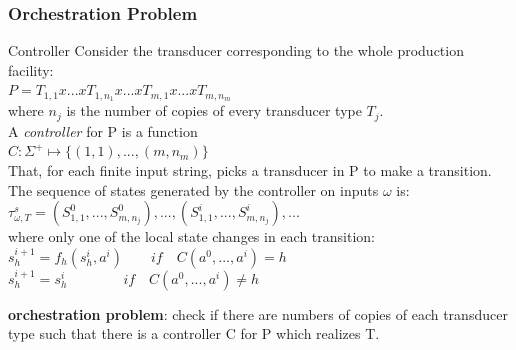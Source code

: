 \documentclass{beamer}
\begin{document}
\begin{frame}
\frametitle{Orchestration Problem}
\begin{block}{Controller}
Consider the transducer corresponding to the whole production facility:\\$P = T_{1,1} x...x T_{1,n_{1}} x ... x T_{m,1}x... x T_{m,n_{m}}$\\ 
where $n_{j}$ is the number of copies of every transducer type $T_{j}$.\\
A \textit{controller} for P is a function \\
$C : \Sigma^{+} \mapsto \{(1,1),...,(m,n_{m})\}$ \\
That, for each finite input string, picks a transducer in P to make a transition. The sequence of states generated by the controller on inputs $\omega$ is: \\
$\tau^{s}_{\omega,T}=(S^{0}_{1,1},...,S^{0}_{m,n_{j}}),...,(S^{i}_{1,1},...,S^{i}_{m,n_{j}}),...$\\
where only one of the local state changes in each transition:\\
$s_{h}^{i+1} = f_{h}(s^{i}_{h},a^{i}) \qquad if\quad C(a^{0},...,a^{i}) = h $\\
$s_{h}^{i+1} = s_{h}^{i} \qquad \qquad  if \quad C(a^{0},...,a^{i})\neq h$
\end{block}
\textbf{orchestration problem}: check if there are numbers of copies of each transducer type such that there is a controller C for P which realizes T.
\end{frame}



\end{document}
